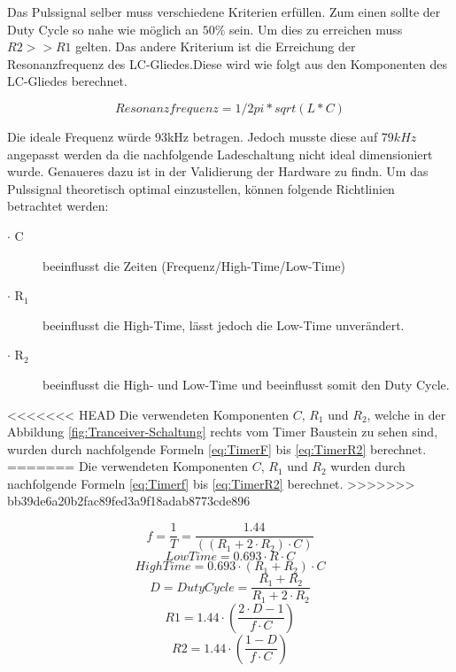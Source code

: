 Das Pulssignal selber muss verschiedene Kriterien erfüllen. Zum einen sollte der Duty Cycle so nahe wie möglich an $50\%$ sein. Um dies zu erreichen muss $R2 >> R1$ gelten. Das andere Kriterium ist die Erreichung der Resonanzfrequenz des LC-Gliedes.Diese wird wie folgt aus den Komponenten des LC-Gliedes berechnet.

\begin{equation}\label{eq:Resonanz}
Resonanzfrequenz=1/2pi*sqrt(L*C)
\end{equation}

Die ideale Frequenz würde 93kHz betragen. Jedoch musste diese auf $79kHz$ angepasst werden da die nachfolgende Ladeschaltung nicht ideal dimensioniert wurde. Genaueres dazu ist in der Validierung der Hardware zu findn.
Um das Pulssignal theoretisch optimal einzustellen, können folgende Richtlinien betrachtet werden:
\begin{description}
	\item [$\cdot$ C] beeinflusst die Zeiten (Frequenz/High-Time/Low-Time)
	\item [$\cdot$ R$_{1}$] beeinflusst die High-Time, lässt jedoch die Low-Time unverändert.
	\item [$\cdot$ R$_{2}$ ] beeinflusst die High- und Low-Time und beeinflusst somit den Duty Cycle.
\end{description}

<<<<<<< HEAD
Die verwendeten Komponenten $C$, $R_{1}$ und $R_{2}$, welche in der Abbildung  \ref{fig:Tranceiver-Schaltung} rechts vom Timer Baustein zu sehen sind, wurden durch nachfolgende Formeln \ref{eq:TimerF} bis \ref{eq:TimerR2} berechnet. 
=======
Die verwendeten Komponenten $C$, $R_{1}$ und $R_{2}$ wurden durch nachfolgende Formeln \ref{eq:Timerf} bis \ref{eq:TimerR2} berechnet. 
>>>>>>> bb39de6a20b2fac89fed3a9f18adab8773cde896

\begin{equation}\label{eq:Timerf}
f= \dfrac{1}{T}= \dfrac{1.44}{((R_{1} + 2 \cdot R_{2})\cdot C)}
\end{equation}
\begin{equation}\label{eq:TimerTL}
LowTime= 0.693 \cdot R \cdot C
\end{equation}
\begin{equation}\label{eq:TimerTH}
HighTime= 0.693 \cdot (R_{1} + R_{2}) \cdot C
\end{equation}
\begin{equation}\label{eq:TimerDC}
D = DutyCycle = \dfrac{R_{1} + R_{2}}{R_{1} + 2 \cdot R_{2}}
\end{equation}
\begin{equation}\label{eq:TimerR1}
R1 = 1.44 \cdot \left( \dfrac{2 \cdot D - 1}{f \cdot C} \right)
\end{equation}
\begin{equation}\label{eq:TimerR2}
R2 = 1.44 \cdot \left( \dfrac{1-D}{f \cdot C} \right)
\end{equation} 

